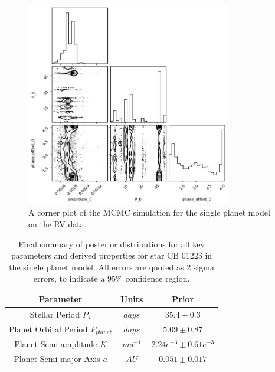 \begin{figure}[htb]
    \centering
    \includegraphics[width=0.8\textwidth]{figures/1planet_model_corner_plot}
    \caption{A corner plot of the MCMC simulation for the single planet model on the RV data.}
    \label{fig:1planet_model_corner_plot}
\end{figure}

\begin{table}[htb]
    \centering
    \begin{tabular}{ccc}
        \toprule
        \toprule
        Parameter & Units & Prior \\
        \midrule
        Stellar Period $P_{\star}$ & $days$ & $35.4 \pm 0.3$ \\
        \addlinespace
        Planet Orbital Period $P_{planet}$ & $days$ & $5.09 \pm 0.87$  \\
        \addlinespace
        Planet Semi-amplitude $K$ & $ms^{-1}$ & $2.24e^{-3} \pm 0.61e^{-3}$ \\
        \addlinespace
        Planet Semi-major Axis $a$ & $AU$ & $0.051 \pm 0.017$ \\
        \bottomrule
    \end{tabular}
    \caption{Final summary of posterior distributions for all key parameters and derived properties for star CB 01223
    in the single planet model. All errors are quoted as 2 sigma errors, to indicate a 95\% confidence region.}
    \label{tab:final_posteriors}
\end{table}
